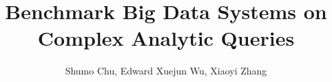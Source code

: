 \documentclass[draft,pdftex,letterpaper]{acm_proc_article-sp}
\begin{document}
\title{Benchmark Big Data Systems on Complex Analytic Queries}

\author{
\alignauthor
    Shumo Chu, Edward Xuejun Wu, Xiaoyi Zhang\\
        \\
        \\
}

\thispagestyle{empty}
\setcounter{page}{0}
\newpage


\maketitle





\begin{sloppypar}








\end{sloppypar}

\newpage



\end{document}
